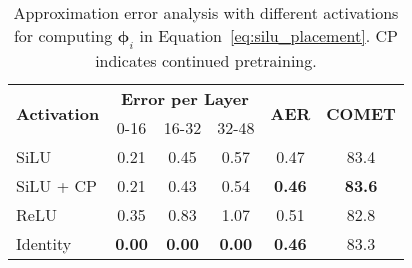 \begin{table}[t]
\centering
\small
\setlength{\tabcolsep}{4.5pt} %
\begin{tabular}{lccccc}
\toprule
\multirow{2}{*}{\textbf{Activation}} & \multicolumn{3}{c}{\textbf{Error per Layer}} & \multirow{2}{*}{\textbf{AER}} & \multirow{2}{*}{\textbf{COMET}}\\
\cmidrule(lr){2-4}
& 0-16 & 16-32 & 32-48 & \\
\midrule
\textsf{SiLU} & 0.21  & 0.45  & 0.57 & 0.47 & 83.4 \\
\textsf{SiLU} + CP & 0.21 & 0.43 & 0.54 & \textbf{0.46} & \textbf{83.6} \\
\textsf{ReLU} & 0.35 & 0.83 & 1.07 & 0.51 & 82.8 \\
\textsf{Identity} & \textbf{0.00} & \textbf{0.00}  & \textbf{0.00} & \textbf{0.46} & 83.3 \\
\bottomrule
\end{tabular}
\caption{Approximation error analysis with different activations for computing $\bm{\phi}_i$ in Equation~\ref{eq:silu_placement}. 
CP indicates continued pretraining. }
\label{tab:mt_approx_error}
\end{table}